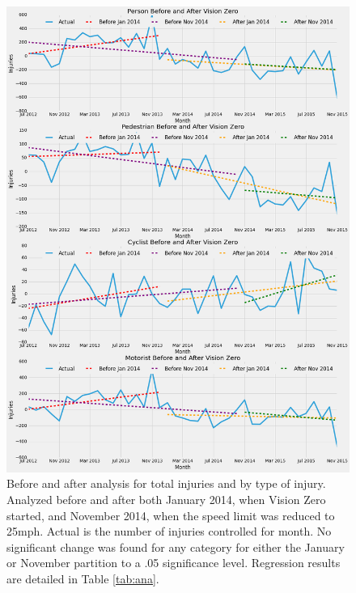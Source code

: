 \documentclass[10pt,journal,compsoc]{IEEEtran}
\begin{document}
\begin{figure}[h]
	\centering
	\includegraphics[width=\textwidth]{fig2.png}
	\caption{Before and after analysis for total injuries and by type of injury.  Analyzed before and after both January 2014, when Vision Zero started, and November 2014, when the speed limit was reduced to 25mph.  Actual is the number of injuries controlled for month.  No significant change was found for any category for either the January or November partition to a .05 significance level.  Regression results are detailed in Table \ref{tab:ana}.}\label{fig:injuryana}
\end{figure}
\end{document}
